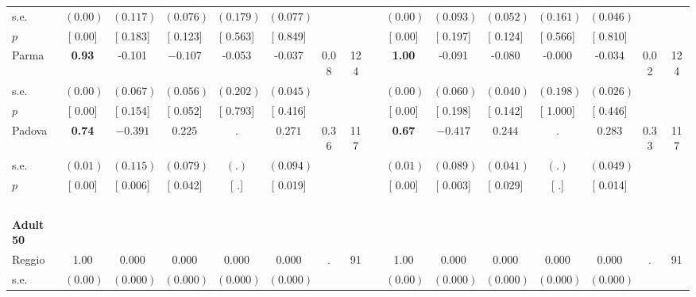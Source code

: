 \begin{longtable}{L{8em} c c c c c c c p{1em} c c c c c c c}
\quad \quad \quad \quad s.e.& $ (     0.00)$ & $ (    0.117)$ & $ (    0.076)$ & $ (    0.179)$ & $ (    0.077)$ & & & & $ (     0.00)$ & $ (    0.093)$ & $ (    0.052)$ & $ (    0.161)$ & $ (    0.046)$ & &  \\*
\quad \quad \quad \quad $ p$ & [     0.00] & [    0.183] & [    0.123] & [    0.563] & [    0.849] & & & & [     0.00] & [    0.197] & [    0.124] & [    0.566] & [    0.810] & &  \\[1em]
\quad \quad \quad Parma& \textbf{     0.93} &    -0.101 & $ \mathbf{   -0.107}$ &    -0.053 &    -0.037 &      0.08 &       124 & & \textbf{     1.00} &    -0.091 &    -0.080 &    -0.000 &    -0.034 &      0.02 &       124  \\*
\quad \quad \quad \quad s.e.& $ (     0.00)$ & $ (    0.067)$ & $ (    0.056)$ & $ (    0.202)$ & $ (    0.045)$ & & & & $ (     0.00)$ & $ (    0.060)$ & $ (    0.040)$ & $ (    0.198)$ & $ (    0.026)$ & &  \\*
\quad \quad \quad \quad $ p$ & [     0.00] & [    0.154] & [    0.052] & [    0.793] & [    0.416] & & & & [     0.00] & [    0.198] & [    0.142] & [    1.000] & [    0.446] & &  \\[1em]
\quad \quad \quad Padova& \textbf{     0.74} & $ \mathbf{   -0.391}$ & $ \mathbf{    0.225}$ &         . & $ \mathbf{    0.271}$ &      0.36 &       117 & & \textbf{     0.67} & $ \mathbf{   -0.417}$ & $ \mathbf{    0.244}$ &         . & $ \mathbf{    0.283}$ &      0.33 &       117  \\*
\quad \quad \quad \quad s.e.& $ (     0.01)$ & $ (    0.115)$ & $ (    0.079)$ & $ (        .)$ & $ (    0.094)$ & & & & $ (     0.01)$ & $ (    0.089)$ & $ (    0.041)$ & $ (        .)$ & $ (    0.049)$ & &  \\*
\quad \quad \quad \quad $ p$ & [     0.00] & [    0.006] & [    0.042] & [        .] & [    0.019] & & & & [     0.00] & [    0.003] & [    0.029] & [        .] & [    0.014] & &  \\[1em]
~\\[1em]
\quad \quad \textbf{Adult 50} & & & & & & & & & & & & & & & \\* 
\quad \quad \quad Reggio& 1.00 &     0.000 &     0.000 &     0.000 &     0.000 &         . &        91 & & 1.00 &     0.000 &     0.000 &     0.000 &     0.000 &         . &        91  \\*
\quad \quad \quad \quad s.e.& $ (     0.00)$ & $ (    0.000)$ & $ (    0.000)$ & $ (    0.000)$ & $ (    0.000)$ & & & & $ (     0.00)$ & $ (    0.000)$ & $ (    0.000)$ & $ (    0.000)$ & $ (    0.000)$ & &  \\*

\end{longtable}
